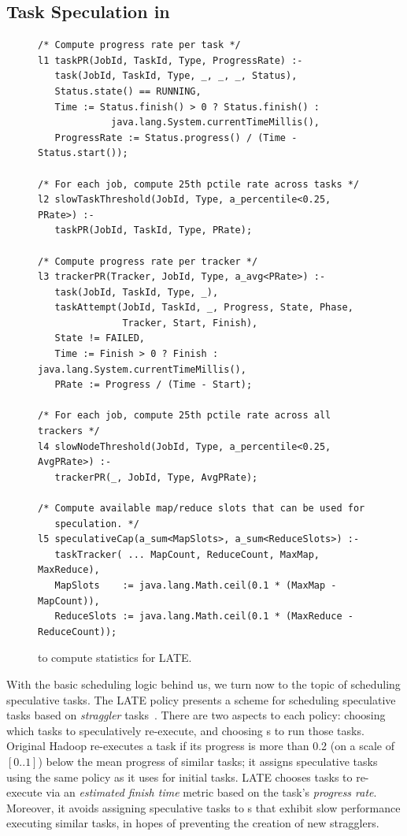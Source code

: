 \subsection{Task Speculation in \OVERLOG}
\label{ch:boom:sec:late}

\begin{figure}[p]
\ssp
\begin{lstlisting}
/* Compute progress rate per task */
l1 taskPR(JobId, TaskId, Type, ProgressRate) :-
   task(JobId, TaskId, Type, _, _, _, Status),
   Status.state() == RUNNING,
   Time := Status.finish() > 0 ? Status.finish() : 
             java.lang.System.currentTimeMillis(),
   ProgressRate := Status.progress() / (Time - Status.start());

/* For each job, compute 25th pctile rate across tasks */
l2 slowTaskThreshold(JobId, Type, a_percentile<0.25, PRate>) :-
   taskPR(JobId, TaskId, Type, PRate);

/* Compute progress rate per tracker */
l3 trackerPR(Tracker, JobId, Type, a_avg<PRate>) :- 
   task(JobId, TaskId, Type, _),
   taskAttempt(JobId, TaskId, _, Progress, State, Phase, 
               Tracker, Start, Finish),
   State != FAILED,
   Time := Finish > 0 ? Finish : java.lang.System.currentTimeMillis(),
   PRate := Progress / (Time - Start);

/* For each job, compute 25th pctile rate across all trackers */
l4 slowNodeThreshold(JobId, Type, a_percentile<0.25, AvgPRate>) :-
   trackerPR(_, JobId, Type, AvgPRate);

/* Compute available map/reduce slots that can be used for 
   speculation. */
l5 speculativeCap(a_sum<MapSlots>, a_sum<ReduceSlots>) :-
   taskTracker( ... MapCount, ReduceCount, MaxMap, MaxReduce),
   MapSlots    := java.lang.Math.ceil(0.1 * (MaxMap - MapCount)),
   ReduceSlots := java.lang.Math.ceil(0.1 * (MaxReduce - ReduceCount));
\end{lstlisting}
\caption{\OVERLOG to compute statistics for LATE.}
\label{fig:latePolicy}
\end{figure}

With the basic scheduling logic behind us, we turn now to the topic of
scheduling speculative tasks.  The LATE policy presents a scheme for scheduling
speculative tasks based on {\em straggler} tasks~\cite{zaharia-late}.  There
are two aspects to each policy: choosing which tasks to speculatively
re-execute, and choosing {\TT}s to run those tasks.  Original Hadoop
re-executes a task if its progress is more than 0.2 (on a scale of $[0..1]$)
below the mean progress of similar tasks; it assigns speculative tasks using
the same policy as it uses for initial tasks.  LATE chooses tasks to re-execute
via an {\em estimated finish time} metric based on the task's \emph{progress
rate}.  Moreover, it avoids assigning speculative tasks to {\TT}s that exhibit
slow performance executing similar tasks, in hopes of preventing the creation
of new stragglers.

